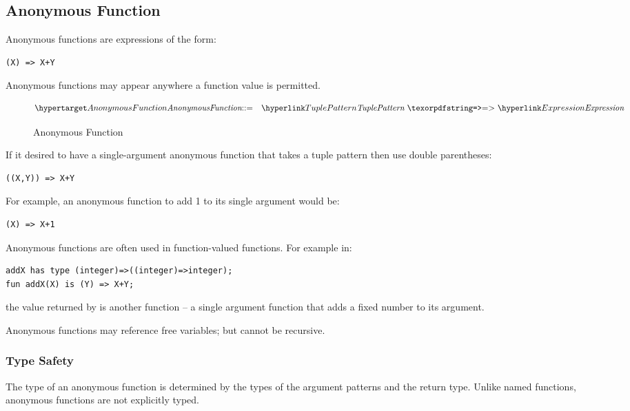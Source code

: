 \subsection{Anonymous Function}
\label{anonymousFunction}

Anonymous functions are expressions of the form:
\begin{lstlisting}
(X) => X+Y
\end{lstlisting}
Anonymous functions may appear anywhere a function value is permitted.


\begin{figure}[htbp]
\begin{eqnarray*}
\ntDef{AnonymousFunction}&\arrow&\ntRef{TuplePattern}\ \q{=>}\ \ntRef{Expression}
\end{eqnarray*}
\caption{Anonymous Function}
\label{anonymousFunctionFig}
\end{figure}

\begin{aside}
If it desired to have a single-argument anonymous function that takes a tuple pattern then use double parentheses:
\begin{lstlisting}
((X,Y)) => X+Y
\end{lstlisting}
\end{aside}

For example, an anonymous function to add 1 to its single argument would be:
\begin{lstlisting}
(X) => X+1
\end{lstlisting}
Anonymous functions are often used in function-valued functions. For example in:
\begin{lstlisting}
addX has type (integer)=>((integer)=>integer);
fun addX(X) is (Y) => X+Y;
\end{lstlisting}
the value returned by  is another function -- a single argument function that adds a fixed number to its argument.

\begin{aside}
Anonymous functions may reference free variables; but cannot be recursive.
\end{aside}


\subsubsection{Type Safety}
The type of an anonymous function is determined by the types of the argument patterns and the return type. Unlike named functions, anonymous functions are not explicitly typed.

